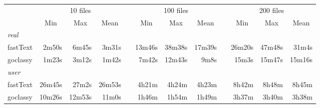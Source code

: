 \begin{table*}[ht!]
    \centering\small
    \begin{tabular}{lrrrcrrrcrrr}\toprule
                 & \multicolumn{3}{c}{10 files} & \phantom{a}             & \multicolumn{3}{c}{100 files} & \phantom{a} & \multicolumn{3}{c}{200 files}                                                                                                                                        \\
        \cmidrule{2-4} \cmidrule{6-8} \cmidrule{10-12}
                 & \multicolumn{1}{c}{Min}      & \multicolumn{1}{c}{Max} & \multicolumn{1}{c}{Mean}      &             & \multicolumn{1}{c}{Min}       & \multicolumn{1}{c}{Max} & \multicolumn{1}{c}{Mean} &  & \multicolumn{1}{c}{Min} & \multicolumn{1}{c}{Max} & \multicolumn{1}{c}{Mean} \\ \midrule
        \emph{real}                                                                                                                                                                                                                                                                            \\
        fastText & 2m50s                        & 6m45s                   & 3m31s                         &             & 13m46s                        & 38m38s                  & 17m39s                   &  & 26m20s                  & 47m48s                  & 31m4s                    \\
        goclassy & 1m23s                        & 3m12s                   & 1m42s                         &             & 7m42s                         & 12m43s                  & 9m8s                     &  & 15m3s                   & 15m47s                  & 15m16s                   \\
        \emph{user}                                                                                                                                                                                                                                                                            \\
        fastText & 26m45s                       & 27m2s                   & 26m53s                        &             & 4h21m                         & 4h24m                   & 4h23m                    &  & 8h42m                   & 8h48m                   & 8h45m                    \\
        goclassy & 10m26s                       & 12m53s                  & 11m0s                         &             & 1h46m                         & 1h54m                   & 1h49m                    &  & 3h37m                   & 3h40m                   & 3h38m                    \\

\end{tabular}
\end{table*}
